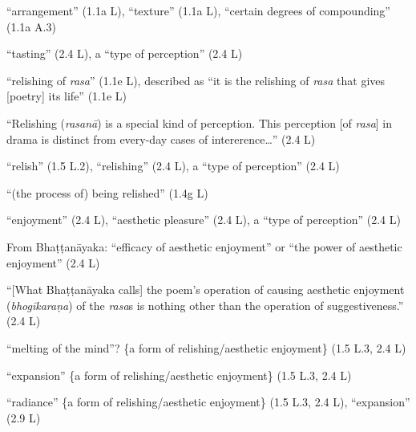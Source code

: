 \documentclass[10pt]{article}
\begin{document}
\begin{multicols}{2}
\begin{enumerate}[
			leftmargin=0em,
			rightmargin=0em,
		]
		 ``arrangement'' (1.1a L), ``texture'' (1.1a L), ``certain degrees of compounding'' (1.1a A.3)




		 ``tasting'' (2.4 L),
		a ``type of perception'' (2.4 L)

		 ``relishing of \textit{rasa}'' (1.1e L),
		described as ``it is the relishing of \textit{rasa} that gives [poetry] its life'' (1.1e L)

		 ``Relishing (\textit{rasanā}) is a special kind of perception. This perception [of \textit{rasa}] in drama is distinct from every-day cases of intererence\dots'' (2.4 L)

		 ``relish'' (1.5 L.2),
		``relishing'' (2.4 L),
		a ``type of perception'' (2.4 L)

		 ``(the process of) being relished'' (1.4g L)

		 ``enjoyment'' (2.4 L),
		``aesthetic pleasure'' (2.4 L),
		a ``type of perception'' (2.4 L)

		 From Bhaṭṭanāyaka: ``efficacy of aesthetic enjoyment'' or ``the power of aesthetic enjoyment'' (2.4 L) %

		 ``[What Bhaṭṭanāyaka calls] the poem's operation of causing aesthetic enjoyment (\textit{bhogīkaraṇa}) of the \textit{rasa}s is nothing other than the operation of suggestiveness.'' (2.4 L)

		 ``melting of the mind''? \{a form of relishing/aesthetic enjoyment\} (1.5 L.3, 2.4 L)

		 ``expansion'' \{a form of relishing/aesthetic enjoyment\} (1.5 L.3, 2.4 L)

		 ``radiance'' \{a form of relishing/aesthetic enjoyment\} (1.5 L.3, 2.4 L),
		``expansion'' (2.9 L)





\end{enumerate}
\end{multicols}
\end{document}

